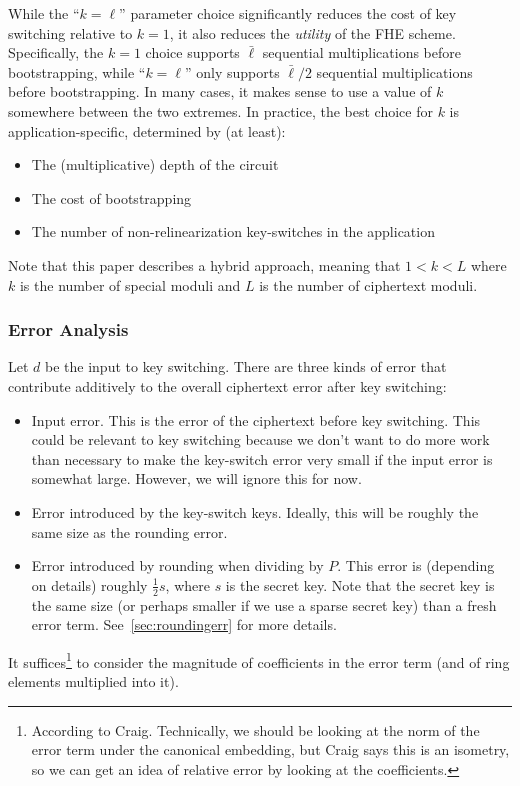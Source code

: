 \documentclass[../keyswitching.tex]{subfiles}
\begin{document}
While the ``$k=\ell$'' parameter choice significantly reduces the cost of key switching relative to $k=1$, it also reduces the \emph{utility} of the FHE scheme. Specifically, the $k=1$ choice supports $\bar{\ell}$ sequential multiplications before bootstrapping, while ``$k=\ell$'' only supports $\bar{\ell}/2$ sequential multiplications before bootstrapping. In many cases, it makes sense to use a value of $k$ somewhere between the two extremes. In practice, the best choice for $k$ is application-specific, determined by (at least):
\begin{itemize}
	\item The (multiplicative) depth of the circuit
	\item The cost of bootstrapping
	\item The number of non-relinearization key-switches in the application
\end{itemize}


Note that this paper describes a hybrid approach, meaning that $1 < k < L$ where $k$ is the number of special moduli and $L$ is the number of ciphertext moduli.

\subsubsection{Error Analysis}
Let $d$ be the input to key switching. There are three kinds of error that contribute additively to the overall ciphertext error after key switching:
\begin{itemize}
	\item Input error. This is the error of the ciphertext before key switching. This could be relevant to key switching because we don't want to do more work than necessary to make the key-switch error very small if the input error is somewhat large. However, we will ignore this for now.
	\item Error introduced by the key-switch keys. Ideally, this will be roughly the same size as the rounding error.
	\item Error introduced by rounding when dividing by $P$. This error is (depending on details) roughly $\frac{1}{2}s$, where $s$ is the secret key. Note that the secret key is the same size (or perhaps smaller if we use a sparse secret key) than a fresh error term. See~\cref{sec:roundingerr} for more details.
\end{itemize}
It suffices\footnote{According to Craig. Technically, we should be looking at the norm of the error term under the canonical embedding, but Craig says this is an isometry, so we can get an idea of relative error by looking at the coefficients.} to consider the magnitude of coefficients in the error term (and of ring elements multiplied into it). 
\end{document}
